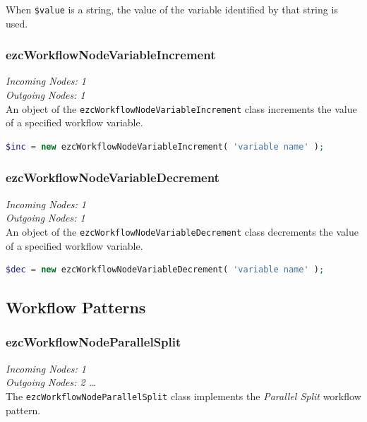 When \texttt{\$value} is a string, the value of the variable identified by
that string is used.

\subsubsection{ezcWorkflowNodeVariableIncrement}

\emph{Incoming Nodes: 1}\\
\emph{Outgoing Nodes: 1}\\

An object of the \texttt{ezcWorkflowNodeVariableIncrement} class increments
the value of a specified workflow variable.

\begin{lstlisting}[language=PHP]
$inc = new ezcWorkflowNodeVariableIncrement( 'variable name' );
\end{lstlisting}

\subsubsection{ezcWorkflowNodeVariableDecrement}

\emph{Incoming Nodes: 1}\\
\emph{Outgoing Nodes: 1}\\

An object of the \texttt{ezcWorkflowNodeVariableDecrement} class decrements
the value of a specified workflow variable.

\begin{lstlisting}[language=PHP]
$dec = new ezcWorkflowNodeVariableDecrement( 'variable name' );
\end{lstlisting}

\subsection{Workflow Patterns}

\subsubsection{ezcWorkflowNodeParallelSplit}

\emph{Incoming Nodes: 1}\\
\emph{Outgoing Nodes: 2 \dots *}\\

The \texttt{ezcWorkflowNodeParallelSplit} class implements the
\emph{Parallel Split} workflow pattern.

